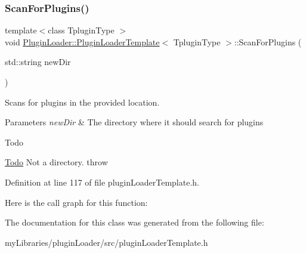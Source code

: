 \subsubsection{\texorpdfstring{ScanForPlugins()}{ScanForPlugins()}}
{\footnotesize\ttfamily template$<$class Tplugin\+Type $>$ \\
void \mbox{\hyperlink{classPluginLoader_1_1PluginLoaderTemplate}{Plugin\+Loader\+::\+Plugin\+Loader\+Template}}$<$ Tplugin\+Type $>$\+::Scan\+For\+Plugins (\begin{DoxyParamCaption}\item[{std\+::string}]{new\+Dir }\end{DoxyParamCaption})}



Scans for plugins in the provided location. 


\begin{DoxyParams}{Parameters}
{\em new\+Dir} & The directory where it should search for plugins \\
\hline
\end{DoxyParams}
\begin{DoxyRefDesc}{Todo}
\item[\mbox{\hyperlink{todo__todo000022}{Todo}}]Not a directory. throw \end{DoxyRefDesc}


Definition at line 117 of file plugin\+Loader\+Template.\+h.

Here is the call graph for this function\+:


The documentation for this class was generated from the following file\+:\begin{DoxyCompactItemize}
\item 
my\+Libraries/plugin\+Loader/src/plugin\+Loader\+Template.\+h\end{DoxyCompactItemize}

